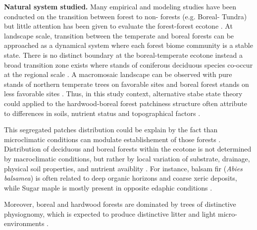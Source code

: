 
\textbf{Natural system studied.} Many empirical and modeling studies have been
conducted on the transition between forest to non- forests (e.g. Boreal-
Tundra) \cite{Scheffer2012,Scheffer2001,Hirota2011,Messaoud2007} but little
attention has been given to evaluate the forest-forest ecotone
\cite{Goldblum2010,Graignic2013,Messaoud2007}. At landscape scale, transition
between  the temperate and boreal forests can be approached as a dynamical
system where each forest biome community is a stable state. There is no
distinct boundary at the boreal-temperate ecotone instead a broad transition
zone exists where stands of coniferous deciduous species co-occur at the
regional scale \cite{Goldblum2010}. A macromosaic landscape can be observed
with pure stands of northern temperate trees on favorable sites and boreal
forest stands on less favorable sites \cite{Goldblum2010,Fisichelli2013}.
Thus, in this study context, alternative stabe state theory could applied to the
hardwood-boreal forest patchiness structure often attribute to differences in
soils, nutrient status and topographical factors \cite{Society2014}.


This segregated patches distribution could be explain by
the fact than microclimatic conditions can modulate establishement of those
forests \cite{DeFrenne2013}. Distribution of deciduous and boreal forests
within the ecotone is not determined by macroclimatic conditions, but rather
by local variation of substrate, drainage, physical soil properties, and
nutrient avaiblity \cite{Goldblum2010,Society2014}.  For instance, balsam fir
(\textit{Abies balsamea}) is often related to deep organic horizons and
coarse xeric deposits, while Sugar maple is mostly present in opposite edaphic
conditions \cite{Messaoud2007,Kellman2004,Barras1998}.


Moreover, boreal and hardwood forests are dominated by trees of distinctive
physiognomy, which is expected to produce distinctive litter and light
micro-environments \cite{Barras1998}.

